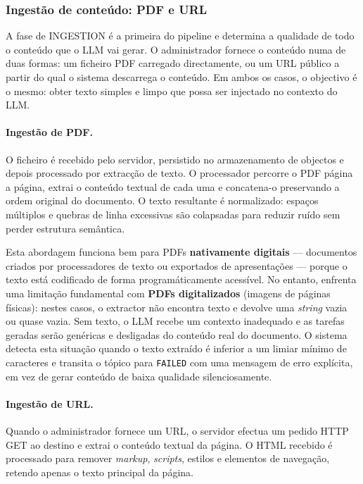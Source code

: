 \subsubsection{Ingest\~ao de conte\'udo: PDF e URL}
\label{sssec:ingestion}

A fase de INGESTION \'e a primeira do pipeline e determina a qualidade de
todo o conte\'udo que o LLM vai gerar. O administrador fornece o conte\'udo
numa de duas formas: um ficheiro PDF carregado directamente, ou um URL
p\'ublico a partir do qual o sistema descarrega o conte\'udo. Em ambos os
casos, o objectivo \'e o mesmo: obter texto simples e limpo que possa ser
injectado no contexto do LLM.

\paragraph{Ingest\~ao de PDF.}
O ficheiro \'e recebido pelo servidor, persistido no armazenamento de
objectos e depois processado por extrac\c{c}\~ao de texto. O processador
percorre o PDF p\'agina a p\'agina, extrai o conte\'udo textual de cada uma
e concatena-o preservando a ordem original do documento. O texto resultante
\'e normalizado: espa\c{c}os m\'ultiplos e quebras de linha excessivas s\~ao
colapsadas para reduzir ru\'ido sem perder estrutura sem\^antica.

Esta abordagem funciona bem para PDFs \textbf{nativamente digitais} ---
documentos criados por processadores de texto ou exportados de apresenta\c{c}\~oes
---  porque o texto est\'a codificado de forma program\'aticamente acess\'ivel.
No entanto, enfrenta uma limita\c{c}\~ao fundamental com \textbf{PDFs
digitalizados} (imagens de p\'aginas f\'isicas): nestes casos, o extractor
n\~ao encontra texto e devolve uma \emph{string} vazia ou quase vazia.
Sem texto, o LLM recebe um contexto inadequado e as tarefas geradas ser\~ao
gen\'ericas e desligadas do conte\'udo real do documento. O sistema detecta
esta situa\c{c}\~ao quando o texto extra\'ido \'e inferior a um limiar m\'inimo
de caracteres e transita o t\'opico para \texttt{FAILED} com uma mensagem de
erro expl\'icita, em vez de gerar conte\'udo de baixa qualidade silenciosamente.

\paragraph{Ingest\~ao de URL.}
Quando o administrador fornece um URL, o servidor efectua um pedido HTTP GET
ao destino e extrai o conte\'udo textual da p\'agina. O HTML recebido \'e
processado para remover \emph{markup}, \emph{scripts}, estilos e elementos
de navega\c{c}\~ao, retendo apenas o texto principal da p\'agina.

